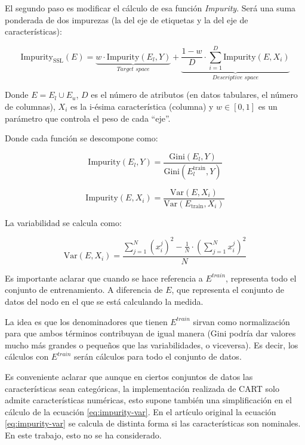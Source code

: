 El segundo paso es modificar el cálculo de esa función \textit{Impurity}. Será una suma ponderada de dos impurezas (la del eje de etiquetas y la del eje de características):

\begin{equation}
\text{Impurity}_{\text{SSL}}(E) = 
\underbrace{w \cdot \text{Impurity}(E_l, Y)}_{\textit{Target space}} + 
\underbrace{\frac{1 - w}{D} \cdot \sum_{i=1}^{D} \text{Impurity}(E, X_i)}_{\textit{Descriptive space}}
\end{equation}

Donde $E = E_l \cup E_u$, $D$ es el número de atributos (en datos tabulares, el número de columnas), $X_i$ es la i-ésima característica (columna) y $w \in [0, 1]$ es un parámetro que controla el peso de cada ``eje''.

Donde cada función se descompone como:

\begin{equation}
\text{Impurity}(E_l, Y) = \frac{\text{Gini}(E_l, Y)}{\text{Gini}(E^{\text{train}}_{l}, Y)}
\end{equation}

\begin{equation}
\text{Impurity}(E, X_i) = \frac{\text{Var}(E, X_i)}{\text{Var}(E_{\text{train}}, X_i)}
\label{eq:impurity-var}
\end{equation}

La variabilidad se calcula como:

\begin{equation}
\text{Var}(E, X_i) = 
\frac{\sum_{j=1}^{N} (x^j_i)^2 - \frac{1}{N} \cdot (\sum_{j=1}^{N} x^j_i)^2}{N}
\end{equation}

Es importante aclarar que cuando se hace referencia a $E^{train}$, representa todo el conjunto de entrenamiento. A diferencia de $E$, que representa el conjunto de datos del nodo en el que se está calculando la medida.

La idea es que los denominadores que tienen $E^{train}$ sirvan como normalización para que ambos términos contribuyan de igual manera (Gini podría dar valores mucho más grandes o pequeños que las variabilidades, o viceversa). Es decir, los cálculos con $E^{train}$ serán cálculos para todo el conjunto de datos.

Es conveniente aclarar que aunque en ciertos conjuntos de datos las características sean categóricas, la implementación realizada de CART solo admite características numéricas, esto supone también una simplificación en el cálculo de la ecuación \ref{eq:impurity-var}. En el artículo original \cite{levatic2017semi} la ecuación \ref{eq:impurity-var} se calcula de distinta forma si las características son nominales. En este trabajo, esto no se ha considerado.

